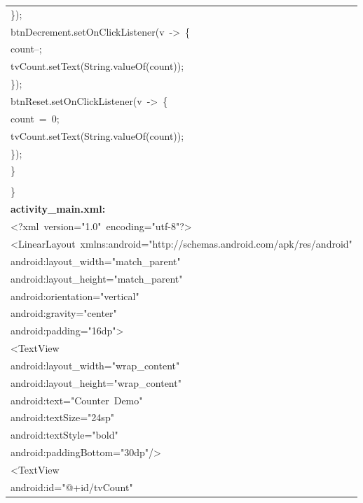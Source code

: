 \documentclass[a4paper,12pt]{article}
\begin{document}
\begin{longtable}{|p{}|}
{\ttfamily\small \});} \\
{\ttfamily\small btnDecrement.setOnClickListener(v\ -\textgreater{}\ \{} \\
{\ttfamily\small count--;} \\
{\ttfamily\small tvCount.setText(String.valueOf(count));} \\
{\ttfamily\small \});} \\
{\ttfamily\small btnReset.setOnClickListener(v\ -\textgreater{}\ \{} \\
{\ttfamily\small count\ =\ 0;} \\
{\ttfamily\small tvCount.setText(String.valueOf(count));} \\
{\ttfamily\small \});} \\
{\ttfamily\small \}} \\
\strut \\
{\ttfamily\small \}} \\
\hline
\rule{0pt}{13pt}\textbf{activity\_main.xml:} \\
\hline
{\ttfamily\small \textless{}?xml\ version="1.0"\ encoding="utf-8"?\textgreater{}} \\
{\ttfamily\small \textless{}LinearLayout\ xmlns:android="http://schemas.android.com/apk/res/android"} \\
{\ttfamily\small android:layout\_width="match\_parent"} \\
{\ttfamily\small android:layout\_height="match\_parent"} \\
{\ttfamily\small android:orientation="vertical"} \\
{\ttfamily\small android:gravity="center"} \\
{\ttfamily\small android:padding="16dp"\textgreater{}} \\
{\ttfamily\small \textless{}TextView} \\
{\ttfamily\small android:layout\_width="wrap\_content"} \\
{\ttfamily\small android:layout\_height="wrap\_content"} \\
{\ttfamily\small android:text="Counter\ Demo"} \\
{\ttfamily\small android:textSize="24sp"} \\
{\ttfamily\small android:textStyle="bold"} \\
{\ttfamily\small android:paddingBottom="30dp"/\textgreater{}} \\
{\ttfamily\small \textless{}TextView} \\
{\ttfamily\small android:id="@+id/tvCount"} \\

\end{longtable}
\end{document}
